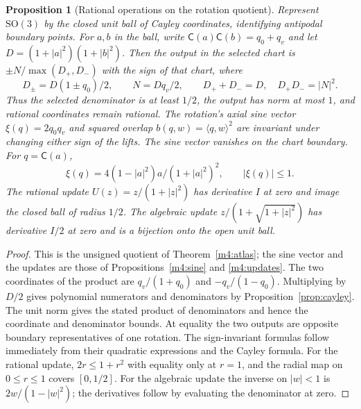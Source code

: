\documentclass[11pt,reqno]{amsart}
\newtheorem{proposition}[theorem]{Proposition}
\theoremstyle{definition}
\theoremstyle{remark}
\numberwithin{equation}{section}
\newcommand{\SO}{\mathrm{SO}}
\newcommand{\Cay}{\mathsf{C}}
\begin{document}
\begin{proposition}[Rational operations on the rotation quotient]
\label{m6:architecture-ops}
Represent \(\SO(3)\) by the closed unit ball of Cayley coordinates,
identifying antipodal boundary points. For \(a,b\) in the ball,
write \(\Cay(a)\Cay(b)=q_0+q_v\) and let
\(D=(1+|a|^2)(1+|b|^2)\). Then the output in the selected chart is
\(\pm N/\max(D_+,D_-)\) with the sign of that chart, where
\[
 D_\pm=D(1\pm q_0)/2,\qquad N=Dq_v/2,\qquad
 D_++D_-=D,\quad D_+D_-=|N|^2.
\]
Thus the selected denominator is at least \(1/2\), the output
has norm at most \(1\), and rational coordinates remain rational.
The rotation's axial sine vector \(\xi(q)=2q_0q_v\) and squared
overlap \(b(q,w)=\langle q,w\rangle^2\) are invariant under
changing either sign of the lifts. The sine vector vanishes
on the chart boundary. For \(q=\Cay(a)\),
\[
 \xi(q)=4(1-|a|^2)a/(1+|a|^2)^2,\qquad |\xi(q)|\le1.
\]
The rational update \(U(z)=z/(1+|z|^2)\) has derivative \(I\)
at zero and image the closed ball of radius \(1/2\).
The algebraic update \(z/(1+\sqrt{1+|z|^2})\) has derivative
\(I/2\) at zero and is a bijection onto the open unit ball.
\end{proposition}
\begin{proof}
This is the unsigned quotient of Theorem~\ref{m4:atlas}; the sine vector and the updates are those of
Propositions~\ref{m4:sine} and \ref{m4:updates}. The two coordinates of the product are \(q_v/(1+q_0)\)
and \(-q_v/(1-q_0)\). Multiplying by \(D/2\) gives polynomial
numerators and denominators by Proposition~\ref{prop:cayley}.
The unit norm gives the stated product of denominators and
hence the coordinate and denominator bounds. At equality
the two outputs are opposite boundary representatives of
one rotation. The sign-invariant formulas follow immediately
from their quadratic expressions and the Cayley formula.
For the rational update, \(2r\le1+r^2\) with equality only
at \(r=1\), and the radial map on \(0\le r\le1\) covers
\([0,1/2]\). For the algebraic update the inverse on
\(|w|<1\) is \(2w/(1-|w|^2)\); the derivatives follow by
evaluating the denominator at zero.
\end{proof}
\end{document}
